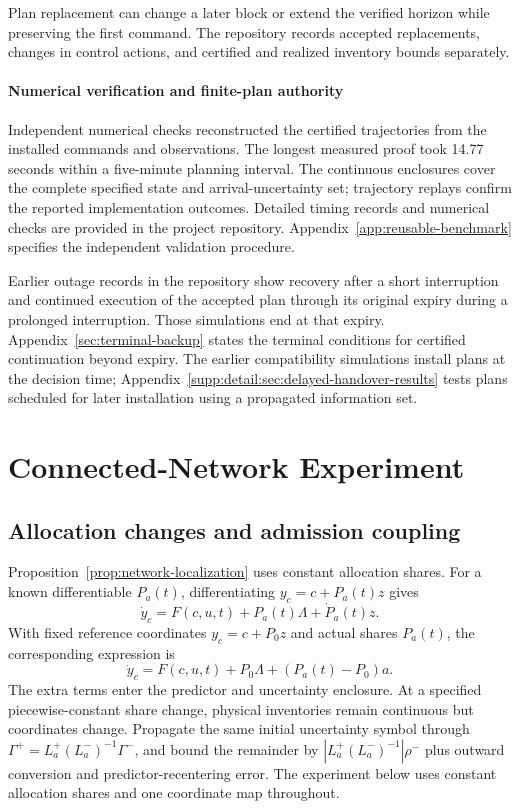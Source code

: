 \documentclass[journal,10pt]{IEEEtran}
\newcommand{\appref}[1]{Appendix~\ref{#1}}
\begin{document}
Plan replacement can change a later block or extend the verified horizon while
preserving the first command. The repository records accepted replacements,
changes in control actions,
and certified and realized inventory bounds separately.

\paragraph{Numerical verification and finite-plan authority}
\label{sec:new-numerical-audit}
Independent numerical checks reconstructed the certified trajectories
from the installed commands and observations. The longest measured proof
took 14.77 seconds within a five-minute planning interval. The continuous
enclosures cover the complete specified state and arrival-uncertainty set;
trajectory replays confirm the reported implementation outcomes. Detailed
timing records and numerical checks are provided in the project
repository. \appref{app:reusable-benchmark} specifies the independent
validation procedure.

Earlier outage records in the repository show recovery after a short
interruption and continued execution of the accepted plan through its
original expiry during a prolonged interruption. Those simulations end
at that expiry. \appref{sec:terminal-backup} states the terminal
conditions for certified continuation beyond expiry. The earlier
compatibility simulations install plans at the decision time;
\appref{supp:detail:sec:delayed-handover-results} tests plans scheduled
for later installation using a propagated information set.

\FloatBarrier
\section{Connected-Network Experiment}
\label{app:network-transfer}

\subsection{Allocation changes and admission coupling}

Proposition~\ref{prop:network-localization} uses constant allocation shares.
For a known differentiable $P_a(t)$, differentiating $y_c=c+P_a(t)z$ gives
\begin{equation}
 \dot y_c=F(c,u,t)+P_a(t)\Lambda+\dot P_a(t)z.
 \label{supp:detail:eq:network-varying-allocation}
\end{equation}
With fixed reference coordinates $y_c=c+P_0z$ and actual shares $P_a(t)$,
the corresponding expression is
\begin{equation}
 \dot y_c=F(c,u,t)+P_0\Lambda+(P_a(t)-P_0)a.
 \label{supp:detail:eq:network-uncertain-allocation}
\end{equation}
The extra terms enter the predictor and uncertainty enclosure. At a specified
piecewise-constant share change, physical inventories remain continuous but
coordinates change. Propagate the same initial uncertainty symbol through
$\Gamma^+=L_a^+(L_a^-)^{-1}\Gamma^-$, and bound the remainder by
$|L_a^+(L_a^-)^{-1}|\rho^-$ plus outward conversion and predictor-recentering
error. The experiment below uses constant allocation shares and one coordinate
map throughout.
\end{document}
